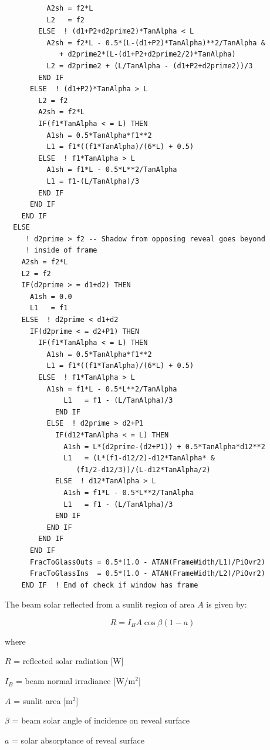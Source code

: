 \begin{lstlisting}
          A2sh = f2*L
          L2   = f2
        ELSE  ! (d1+P2+d2prime2)*TanAlpha < L
          A2sh = f2*L - 0.5*(L-(d1+P2)*TanAlpha)**2/TanAlpha &
             + d2prime2*(L-(d1+P2+d2prime2/2)*TanAlpha)
          L2 = d2prime2 + (L/TanAlpha - (d1+P2+d2prime2))/3
        END IF
      ELSE  ! (d1+P2)*TanAlpha > L
        L2 = f2
        A2sh = f2*L
        IF(f1*TanAlpha < = L) THEN
          A1sh = 0.5*TanAlpha*f1**2
          L1 = f1*((f1*TanAlpha)/(6*L) + 0.5)
        ELSE  ! f1*TanAlpha > L
          A1sh = f1*L - 0.5*L**2/TanAlpha
          L1 = f1-(L/TanAlpha)/3
        END IF
      END IF
    END IF
  ELSE
     ! d2prime > f2 -- Shadow from opposing reveal goes beyond
     ! inside of frame
    A2sh = f2*L
    L2 = f2
    IF(d2prime > = d1+d2) THEN
      A1sh = 0.0
      L1   = f1
    ELSE  ! d2prime < d1+d2
      IF(d2prime < = d2+P1) THEN
        IF(f1*TanAlpha < = L) THEN
          A1sh = 0.5*TanAlpha*f1**2
          L1 = f1*((f1*TanAlpha)/(6*L) + 0.5)
        ELSE  ! f1*TanAlpha > L
          A1sh = f1*L - 0.5*L**2/TanAlpha
              L1   = f1 - (L/TanAlpha)/3
            END IF
          ELSE  ! d2prime > d2+P1
            IF(d12*TanAlpha < = L) THEN
              A1sh = L*(d2prime-(d2+P1)) + 0.5*TanAlpha*d12**2
              L1   = (L*(f1-d12/2)-d12*TanAlpha* &
                 (f1/2-d12/3))/(L-d12*TanAlpha/2)
            ELSE  ! d12*TanAlpha > L
              A1sh = f1*L - 0.5*L**2/TanAlpha
              L1   = f1 - (L/TanAlpha)/3
            END IF
          END IF
        END IF
      END IF
      FracToGlassOuts = 0.5*(1.0 - ATAN(FrameWidth/L1)/PiOvr2)
      FracToGlassIns  = 0.5*(1.0 - ATAN(FrameWidth/L2)/PiOvr2)
    END IF  ! End of check if window has frame
\end{lstlisting}

The beam solar reflected from a sunlit region of area \(A\) is given by:

\begin{equation}
R = {I_B}A\cos \beta (1 - a){\mathrm{ }}
\end{equation}

where

\(R\) = reflected solar radiation {[}W{]}

\({I_B}\) = beam normal irradiance {[}W/m\(^{2}\){]}

\(A\) = sunlit area {[}m\(^{2}\){]}

\(\beta\) = beam solar angle of incidence on reveal surface

\(a\) = solar absorptance of reveal surface

